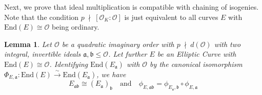 \documentclass{ociamthesis}
\newcommand{\End}{\mathrm{End}}
\newcommand{\notdivides}{\ \nmid \ }
\renewcommand{\a}{\mathfrak{a}}
\renewcommand{\b}{\mathfrak{b}}
\renewcommand{\O}{\mathcal{O}}
\newtheorem{lemma}[prop]{Lemma}
\theoremstyle{definition}
\begin{document}
Next, we prove that ideal multiplication is compatible with chaining of isogenies.
Note that the condition $p \notdivides [\O_K : \O]$ is just equivalent to all curves $E$ with $\End(E) \cong \O$ being ordinary.
\begin{lemma}
    Let $\O$ be a quadratic imaginary order with $p \notdivides d(\O)$ with two integral, invertible ideals $\a, \b \leq \O$.
    Let further $E$ be an Elliptic Curve with $\End(E) \cong \O$.
    Identifying $\End(E_\a)$ with $\O$ by the canonical isomorphism $\Phi_{E, \a}: \End(E) \overset{\sim}{\longrightarrow} \End(E_\a)$, we have
    \begin{equation*}
        E_{\a\b} \cong (E_\a)_\b \quad \text{and} \quad \phi_{E, \a\b} = \phi_{E_\a, \b} \circ \phi_{E, \a}
    \end{equation*}
\end{lemma}
\end{document}
